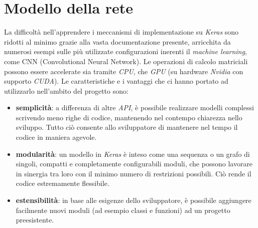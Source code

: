 \section{Modello della rete}
La difficoltà nell’apprendere i meccanismi di implementazione su \textit{Keras} sono ridotti al minimo grazie alla vasta documentazione presente, arricchita da numerosi esempi sulle più utilizzate configurazioni inerenti il \textit{machine learning}, come CNN (Convolutional Neural Network).
Le operazioni di calcolo matriciali possono essere accelerate sia tramite \textit{CPU}, che \textit{GPU} (su hardware \textit{Nvidia} con supporto \textit{CUDA}).
Le caratteristiche e i vantaggi che ci hanno portato ad utilizzarlo nell’ambito del progetto sono:
\begin{itemize}
	\item \textbf{semplicità}: a differenza di altre \textit{API}, è possibile realizzare modelli complessi scrivendo meno righe di codice, mantenendo nel contempo chiarezza nello sviluppo. Tutto ciò consente allo sviluppatore di mantenere nel tempo il codice in maniera agevole.
	\item \textbf{modularità}: un modello in \textit{Keras} è inteso come una sequenza o un grafo di singoli, compatti e completamente configurabili moduli, che possono lavorare in sinergia tra loro con il minimo numero di restrizioni possibili. Ciò rende il codice estremamente flessibile.
	\item \textbf{estensibilità}: in base alle esigenze dello sviluppatore, è possibile aggiungere facilmente nuovi moduli (ad esempio classi e funzioni) ad un progetto preesistente.
\end{itemize}
